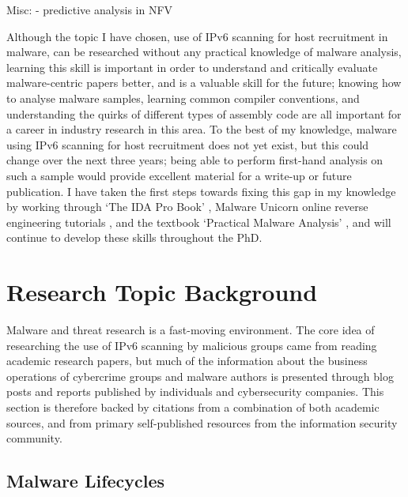 \documentclass[10pt,sigconf]{acmart}
\begin{document}
Misc:
	- predictive analysis in NFV

Although the topic I have chosen, use of IPv6 scanning for host recruitment in malware, can be researched without any practical knowledge of malware analysis, learning this skill is important in order to understand and critically evaluate malware-centric papers better, and is a valuable skill for the future;
knowing how to analyse malware samples, learning common compiler conventions, and understanding the quirks of different types of assembly code are all important for a career in industry research in this area.
To the best of my knowledge, malware using IPv6 scanning for host recruitment does not yet exist, but this could change over the next three years;
being able to perform first-hand analysis on such a sample would provide excellent material for a write-up or future publication.
I have taken the first steps towards fixing this gap in my knowledge by working through `The IDA Pro Book' \cite{ida-book}, Malware Unicorn online reverse engineering tutorials \cite{malware-unicorn}, and the textbook `Practical Malware Analysis' \cite{malware-analysis}, and will continue to develop these skills throughout the PhD.

\section{Research Topic Background}

Malware and threat research is a fast-moving environment.
The core idea of researching the use of IPv6 scanning by malicious groups came from reading academic research papers, but much of the information about the business operations of cybercrime groups and malware authors is presented through blog posts and reports published by individuals and cybersecurity companies.
This section is therefore backed by citations from a combination of both academic sources, and from primary self-published resources from the information security community.

\subsection{Malware Lifecycles}
\end{document}
